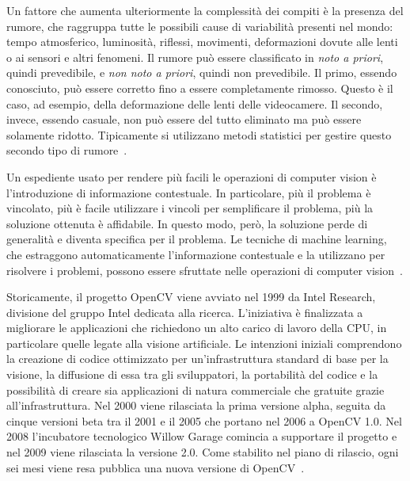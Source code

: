 				Un fattore che aumenta ulteriormente la complessità dei compiti è la presenza del rumore, che raggruppa tutte le possibili cause di variabilità presenti nel mondo: tempo atmosferico, luminosità, riflessi, movimenti, deformazioni dovute alle lenti o ai sensori e altri fenomeni.
				Il rumore può essere classificato in \emph{noto a priori}, quindi prevedibile, e \emph{non noto a priori}, quindi non prevedibile. 
				Il primo, essendo conosciuto, può essere corretto fino a essere completamente rimosso.
				Questo è il caso, ad esempio, della deformazione delle lenti delle videocamere.
				Il secondo, invece, essendo casuale, non può essere del tutto eliminato ma può essere solamente ridotto.
				Tipicamente si utilizzano metodi statistici per gestire questo secondo tipo di rumore~\cite{bradski2008learning}. 
			 
				Un espediente usato per rendere più facili le operazioni di computer vision è l'introduzione di informazione contestuale. 
				In particolare, più il problema è vincolato, più è facile utilizzare i vincoli per semplificare il problema, più la soluzione ottenuta è affidabile.
				In questo modo, però, la soluzione perde di generalità e diventa specifica per il problema.
				Le tecniche di machine learning, che estraggono automaticamente l'informazione contestuale e la utilizzano per risolvere i problemi, possono essere sfruttate nelle operazioni di computer vision~\cite{bradski2008learning}.
				
				Storicamente, il progetto OpenCV viene avviato nel 1999 da Intel Research, divisione del gruppo Intel dedicata alla ricerca. 
				L'iniziativa è finalizzata a migliorare le applicazioni che richiedono un alto carico di lavoro della CPU, in particolare quelle legate alla visione artificiale. 
				Le intenzioni iniziali comprendono la creazione di codice ottimizzato per un'infrastruttura standard di base per la visione, la diffusione di essa tra gli sviluppatori, la portabilità del codice e la possibilità di creare sia applicazioni di natura commerciale che gratuite grazie all'infrastruttura. 
				Nel 2000 viene rilasciata la prima versione alpha, seguita da cinque versioni beta tra il 2001 e il 2005 che portano nel 2006 a \mbox{OpenCV} 1.0.	
				Nel 2008 l'incubatore tecnologico Willow Garage comincia a supportare il progetto e nel 2009 viene rilasciata la versione 2.0. 
				Come stabilito nel piano di rilascio, ogni sei mesi viene resa pubblica una nuova versione di \mbox{OpenCV}~\cite{OpenCV:ChangeLogs}.

